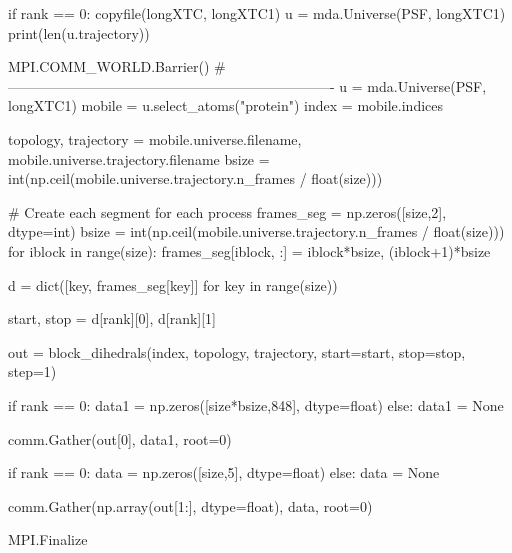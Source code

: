 \begin{python}
if rank == 0:
    copyfile(longXTC, longXTC1)
    u = mda.Universe(PSF, longXTC1)
    print(len(u.trajectory))

MPI.COMM_WORLD.Barrier()
#----------------------------------------------------------------------
u = mda.Universe(PSF, longXTC1)
mobile = u.select_atoms("protein")
index = mobile.indices

topology, trajectory = mobile.universe.filename, mobile.universe.trajectory.filename
bsize = int(np.ceil(mobile.universe.trajectory.n_frames / float(size)))

# Create each segment for each process
frames_seg = np.zeros([size,2], dtype=int)
bsize = int(np.ceil(mobile.universe.trajectory.n_frames / float(size)))
for iblock in range(size):
    frames_seg[iblock, :] = iblock*bsize, (iblock+1)*bsize

d = dict([key, frames_seg[key]] for key in range(size))

start, stop = d[rank][0], d[rank][1]

out = block_dihedrals(index, topology, trajectory, start=start, stop=stop, step=1)

if rank == 0:
   data1 = np.zeros([size*bsize,848], dtype=float)
else:
   data1 = None

comm.Gather(out[0], data1, root=0)

if rank == 0:
    data = np.zeros([size,5], dtype=float)
else:
    data = None

comm.Gather(np.array(out[1:], dtype=float), data, root=0)

MPI.Finalize   
\end{python}